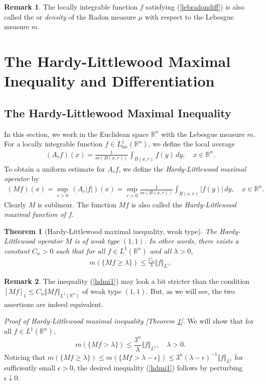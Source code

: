 \documentclass{article}
\numberwithin{equation}{section}
\newcommand{\bbR}{\mathbb{R}}
\newcommand{\loc}{\mathrm{loc}}
\theoremstyle{plain}
\newtheorem{theorem}{Theorem}[section]
\theoremstyle{definition}
\newtheorem*{remark}{Remark}
\begin{document}
\begin{remark}
The locally integrable function $f$ satisfying (\ref{lebradondiff}) is also called the  or \textit{density} of the Radon measure $\mu$ with respect to the Lebesgue measure $m$.
\end{remark}

\newpage
\section{The Hardy-Littlewood Maximal Inequality and Differentiation}
\subsection{The Hardy-Littlewood Maximal Inequality}
In this section, we work in the Euclidean space $\bbR^n$ with the Lebesgue measure $m$. For a locally integrable function $f\in L^1_\loc(\bbR^n)$, we define the local average
\begin{align*}
	(A_rf)(x)=\frac{1}{m(B(x,r))}\int_{B(x,r)}f(y)\,dy,\quad x\in\bbR^n.
\end{align*}
To obtain a uniform estimate for $A_rf$, we define the \textit{Hardy-Littlewood maximal operator} by
\begin{align*}
	(Mf)(x)=\sup_{r>0}\,(A_r\vert f\vert)(x)=\sup_{r>0}\frac{1}{m(B(x,r))}\int_{B(x,r)}\vert f(y)\vert\,dy,\quad x\in\bbR^n.
\end{align*}
Clearly $M$ is sublinear. The function $Mf$ is also called the \textit{Hardy-Littlewood maximal function of $f$}.

\begin{theorem}[Hardy-Littlewood maximal inequality, weak type]\label{hdmiw}
The Hardy-Littlewood operator $M$ is of weak type $(1,1)$. In other words, there exists a constant $C_n>0$ such that for all $f\in L^1(\bbR^n)$ and all $\lambda>0$,
\begin{align}
	m\left(\{Mf\geq\lambda\}\right)\leq\frac{C_n}{\lambda}\Vert f\Vert_{L^1}.\label{hdmi1}
\end{align}
\end{theorem}
\begin{remark}
The inequality (\ref{hdmi1}) may look a bit stricter than the condition $[Mf]_1\leq C_n\Vert Mf\Vert_{L^1(\bbR^n)}$ of weak type $(1,1)$. But, as we will see, the two assertions are indeed equivalent.
\end{remark}


\textit{\hspace{-2em} Proof of Hardy-Littlewood maximal inequality [Theorem \ref{hdmiw}].}
We will show that for all $f\in L^1(\bbR^n)$, $$m(\{Mf>\lambda\})\leq\frac{3^n}{\lambda}\Vert f\Vert_{L^1},\quad\lambda>0.$$
Noticing that $m(\{Mf\geq\lambda\})\leq m(\{Mf>\lambda-\epsilon\})\leq 3^n(\lambda-\epsilon)^{-1}\Vert f\Vert_{L^1}$ for sufficiently small $\epsilon>0$, the desired inequality (\ref{hdmi1}) follows by perturbing $\epsilon\downarrow 0$. 
\end{document}
